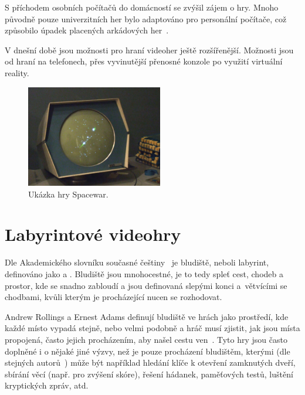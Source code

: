 S příchodem osobních počítačů do domácností se zvýšil zájem o hry. Mnoho původně pouze univerzitních her bylo adaptováno pro personální počítače, což způsobilo úpadek placených arkádových her~\cite{novak2011game}. 

V dnešní době jsou možnosti pro hraní videoher ještě rozšířenější. Možnosti jsou od hraní na telefonech, přes vyvinutější přenosné konzole po využití virtuální reality.

\begin{figure}[H]
    \centering
	\includegraphics[width=0.53\textwidth]{obrazky-figures/ch2/Spacewar.png}
	\caption{Ukázka hry Spacewar.~\cite{bellis2019spacewar}}
	\label{fig:spacewar}
\end{figure}

\section{Labyrintové videohry}
Dle Akademického slovníku současné češtiny~\cite{AkademickySlovnik-Bludiste} je bludiště, neboli labyrint, definováno jako  a . Bludiště jsou mnohocestné, je to tedy spleť cest, chodeb a prostor, kde se snadno zabloudí a jsou definovaná slepými konci a~větvícími se chodbami, kvůli kterým je procházející nucen se rozhodovat.

Andrew Rollings a Ernest Adams definují bludiště ve hrách jako prostředí, kde každé místo vypadá stejně, nebo velmi podobně a hráč musí zjistit, jak jsou místa propojená, často jejich procházením, aby našel cestu ven~\cite{rollings2003andrew}. Tyto hry jsou často doplněné i o nějaké jiné výzvy, než je pouze procházení bludištěm, kterými (dle stejných autorů~\cite{rollings2003andrew}) může být například hledání klíče k otevření zamknutých dveří, sbírání věcí (např. pro zvýšení skóre), řešení hádanek, paměťových testů, luštění kryptických zpráv, atd.


